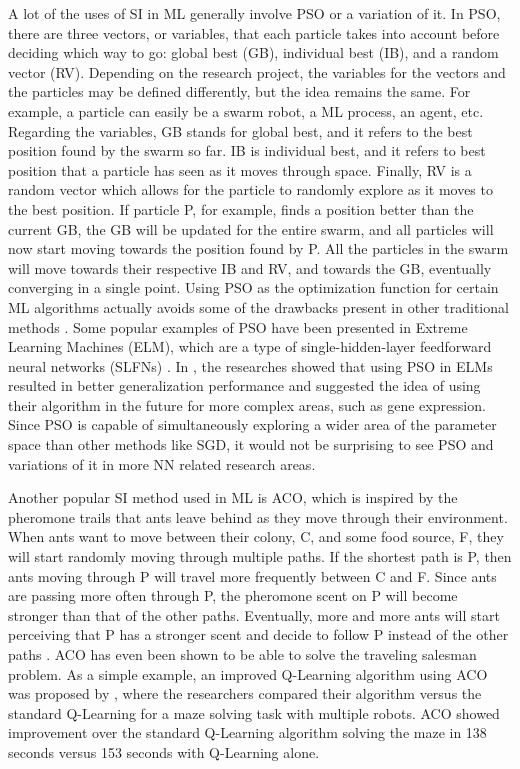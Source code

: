 \documentclass[twocolumn]{bmcart}%
\begin{document}
A lot of the uses of SI in ML generally involve PSO or a variation of it. In PSO, there are three vectors, or variables, that each particle takes into account before deciding which way to go: global best (GB), individual best (IB), and a random vector (RV). Depending on the research project, the variables for the vectors and the particles may be defined differently, but the idea remains the same. For example, a particle can easily be a swarm robot, a ML process, an agent, etc. Regarding the variables, GB stands for global best, and it refers to the best position found by the swarm so far. IB is individual best, and it refers to best position that a particle has seen as it moves through space. Finally, RV is a random vector which allows for the particle to randomly explore as it moves to the best position. If particle P, for example, finds a position better than the current GB, the GB will be updated for the entire swarm, and all particles will now start moving towards the position found by P. All the particles in the swarm will move towards their respective IB and RV, and towards the GB, eventually converging in a single point. Using PSO as the optimization function for certain ML algorithms actually avoids some of the drawbacks present in other traditional methods \cite{Kennedy, PSO}. Some popular examples of PSO have been presented in Extreme Learning Machines (ELM), which are a type of single-hidden-layer feedforward neural networks (SLFNs) \cite{Zeng}. In \cite{Han}, the researches showed that using PSO in ELMs resulted in better generalization performance and suggested the idea of using their algorithm in the future for more complex areas, such as gene expression. Since PSO is capable of simultaneously exploring a wider area of the parameter space than other methods like SGD, it would not be surprising to see PSO and variations of it in more NN related research areas.

Another popular SI method used in ML is ACO, which is inspired by the pheromone trails that ants leave behind as they move through their environment. When ants want to move between their colony, C, and some food source, F, they will start randomly moving through multiple paths. If the shortest path is P, then ants moving through P will travel more frequently between C and F. Since ants are passing more often through P, the pheromone scent on P will become stronger than that of the other paths. Eventually, more and more ants will start perceiving that P has a stronger scent and decide to follow P instead of the other paths \cite{Dorigo}. ACO has even been shown to be able to solve the traveling salesman problem. As a simple example, an improved Q-Learning algorithm using ACO was proposed by \cite{Zhiguo}, where the researchers compared their algorithm versus the standard Q-Learning for a maze solving task with multiple robots. ACO showed improvement over the standard Q-Learning algorithm solving the maze in 138 seconds versus 153 seconds with Q-Learning alone. 
\end{document}
